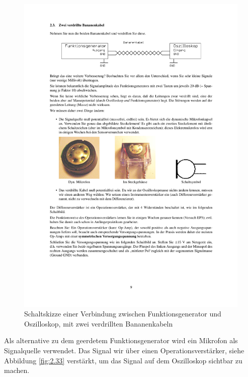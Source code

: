 \documentclass[12pt,a4paper]{article}
\begin{document}
\begin{figure}[H] 
  \centering
    \includegraphics[trim = 10mm 230mm 10mm 32mm, clip, scale = 1]{2_3.pdf}
  	\caption[Schaltskizze einer Verbindung zwischen Funktionsgenerator und Oszilloskop, mit zwei verdrillten Bananenkabeln]{Schaltskizze einer Verbindung zwischen Funktionsgenerator und Oszilloskop, mit zwei verdrillten Bananenkabeln\footnotemark}
  \label{fig:2.3}
\end{figure}

Als alternative zu dem geerdetem Funktionsgenerator wird ein Mikrofon als Signalquelle verwendet. Das Signal wir über einen Operationsverstärker, siehe Abbildung \ref{fig:2.33} verstärkt, um das Signal auf dem Oszilloskop sichtbar zu machen.
\end{document}
